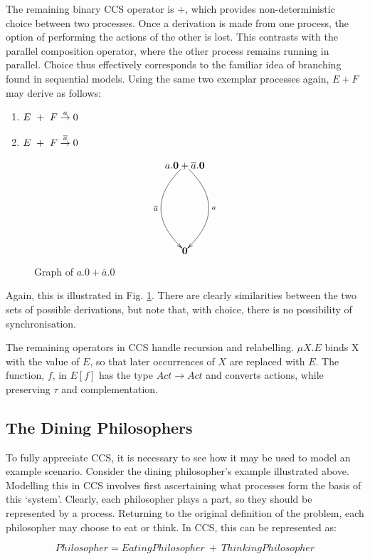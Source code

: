 The remaining binary CCS operator is $+$, which provides
non-deterministic choice between two processes.  Once a derivation is
made from one process, the option of performing the actions of the
other is lost.  This contrasts with the parallel composition operator,
where the other process remains running in parallel.  Choice thus
effectively corresponds to the familiar idea of branching found in
sequential models.  Using the same two exemplar processes again, $E +
F$ may derive as follows:

\begin{enumerate}
\item $E\ +\ F \stackrel{a}{\rightarrow} 0$
\item $E\ +\ F \stackrel{\overline{a}}{\rightarrow} 0$
\end{enumerate}


\begin{figure}  
  \centering
\[
\xy
(20,0)*{a.\nil + \overline{a}.\nil}="1";
(20,-30)*{\nil}="2";
{\ar@/^2pc/^{a} "1";"2"};
{\ar@/_2pc/_{\overline{a}} "1";"2"};
\endxy
\]
  \caption{Graph of $a.0 + \overline{a}.0$}
  \label{fig:graph2}
\end{figure}

Again, this is illustrated in Fig. \ref{fig:graph2}.  There are clearly
similarities between the two sets of possible derivations, but note
that, with choice, there is no possibility of synchronisation.

The remaining operators in CCS handle recursion and relabelling.  $\mu
X.E$ binds X with the value of $E$, so that later occurrences of $X$ are
replaced with $E$.  The function, $f$, in $E[f]$ has the type $Act
\rightarrow Act$ and converts actions, while preserving $\tau$ and
complementation.

\subsection{The Dining Philosophers}

To fully appreciate CCS, it is necessary to see how it may be used to
model an example scenario.  Consider the dining philosopher's example
illustrated above. Modelling this in CCS involves first ascertaining
what processes form the basis of this `system'.  Clearly, each
philosopher plays a part, so they should be represented by a process.
Returning to the original definition of the problem, each philosopher
may choose to eat or think.  In CCS, this can be represented as:

\begin{equation}
Philosopher = EatingPhilosopher\ +\ ThinkingPhilosopher
\end{equation}

